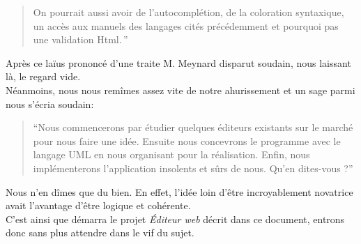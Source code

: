 \documentclass[a4paper, 12pt]{report}
\begin{document}
\begin{chapter}
\begin{quotation}
		On pourrait aussi avoir de l'\gls{autocomplétion}, de la coloration syntaxique, un accès aux manuels des langages cités précédemment et pourquoi
		pas une validation Html.\,''
	\end{quotation}

	Après ce laïus prononcé d'une traite M. Meynard disparut soudain, nous laissant là, le regard vide.\\


	Néanmoins, nous nous remîmes assez vite de notre ahurissement et un sage parmi nous s'écria soudain:
	\begin{quotation}
		``Nous commencerons par étudier quelques éditeurs existants sur le marché pour nous faire une idée. Ensuite nous concevrons
		le programme avec le langage UML en nous organisant pour la réalisation.
		Enfin, nous implémenterons l'application insolents et sûrs de nous.	Qu'en dites-vous ?''
	\end{quotation}

	Nous n'en dîmes que du bien. En effet, l'idée loin d'être incroyablement novatrice avait l'avantage d'être logique et cohérente.\\


	C'est ainsi que démarra le projet \emph{Éditeur web} décrit dans ce document, entrons donc sans plus attendre dans le vif du sujet.
	
	\end{chapter}
\end{document}
